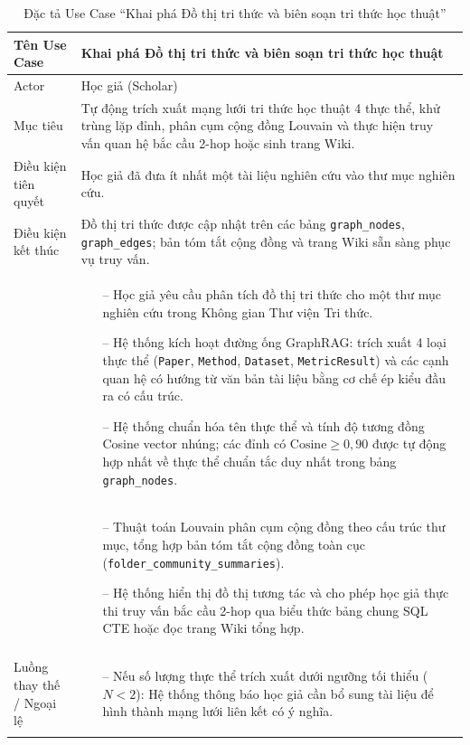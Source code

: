 \begingroup
\setlength{\tabcolsep}{6pt}
\renewcommand{\arraystretch}{1.20}
\begin{xltabular}{\textwidth}{|>{\raggedright\arraybackslash}m{3.2cm}|>{\raggedright\arraybackslash}X|}
\caption{Đặc tả Use Case ``Khai phá Đồ thị tri thức và biên soạn tri thức học thuật''} \label{tab:uc_graphrag_spec} \\
\hline
\endfirsthead

\hline
\endhead

\hline
\endfoot

\hline
\endlastfoot

Tên Use Case & Khai phá Đồ thị tri thức và biên soạn tri thức học thuật \tabularnewline \hline
Actor & Học giả (Scholar) \tabularnewline \hline
Mục tiêu & Tự động trích xuất mạng lưới tri thức học thuật 4 thực thể, khử trùng lặp đỉnh, phân cụm cộng đồng Louvain và thực hiện truy vấn quan hệ bắc cầu 2-hop hoặc sinh trang Wiki. \tabularnewline \hline
Điều kiện tiên quyết & Học giả đã đưa ít nhất một tài liệu nghiên cứu vào thư mục nghiên cứu. \tabularnewline \hline
Điều kiện kết thúc & Đồ thị tri thức được cập nhật trên các bảng \texttt{graph\_nodes}, \texttt{graph\_edges}; bản tóm tắt cộng đồng và trang Wiki sẵn sàng phục vụ truy vấn. \tabularnewline \hline
{} & 
\begin{itemize}[leftmargin=*, noitemsep, topsep=0pt]
    \item[--] Học giả yêu cầu phân tích đồ thị tri thức cho một thư mục nghiên cứu trong Không gian Thư viện Tri thức.
    \item[--] Hệ thống kích hoạt đường ống GraphRAG: trích xuất 4 loại thực thể (\texttt{Paper}, \texttt{Method}, \texttt{Dataset}, \texttt{MetricResult}) và các cạnh quan hệ có hướng từ văn bản tài liệu bằng cơ chế ép kiểu đầu ra có cấu trúc.
    \item[--] Hệ thống chuẩn hóa tên thực thể và tính độ tương đồng Cosine vector nhúng; các đỉnh có $\text{Cosine} \ge 0{,}90$ được tự động hợp nhất về thực thể chuẩn tắc duy nhất trong bảng \texttt{graph\_nodes}.
\end{itemize} \tabularnewline {}
& 
\begin{itemize}[leftmargin=*, noitemsep, topsep=0pt]
    \item[--] Thuật toán Louvain phân cụm cộng đồng theo cấu trúc thư mục, tổng hợp bản tóm tắt cộng đồng toàn cục (\texttt{folder\_community\_summaries}).
    \item[--] Hệ thống hiển thị đồ thị tương tác và cho phép học giả thực thi truy vấn bắc cầu 2-hop qua biểu thức bảng chung SQL CTE hoặc đọc trang Wiki tổng hợp.
\end{itemize} \tabularnewline \hline
Luồng thay thế / Ngoại lệ & 
\begin{itemize}[leftmargin=*, noitemsep, topsep=0pt]
    \item[--] Nếu số lượng thực thể trích xuất dưới ngưỡng tối thiểu ($N < 2$): Hệ thống thông báo học giả cần bổ sung tài liệu để hình thành mạng lưới liên kết có ý nghĩa.
\end{itemize} \tabularnewline
\end{xltabular}
\endgroup
\FloatBarrier

